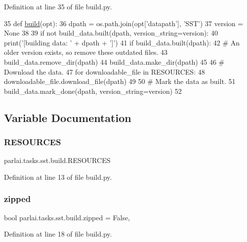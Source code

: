 Definition at line 35 of file build.\+py.


\begin{DoxyCode}
35 \textcolor{keyword}{def }\hyperlink{namespacedialog__babi__feedback_1_1build_a7a9d289f7493a5ded13c4b7f071b6184}{build}(opt):
36     dpath = os.path.join(opt[\textcolor{stringliteral}{'datapath'}], \textcolor{stringliteral}{'SST'})
37     version = \textcolor{keywordtype}{None}
38 
39     \textcolor{keywordflow}{if} \textcolor{keywordflow}{not} build\_data.built(dpath, version\_string=version):
40         print(\textcolor{stringliteral}{'[building data: '} + dpath + \textcolor{stringliteral}{']'})
41         \textcolor{keywordflow}{if} build\_data.built(dpath):
42             \textcolor{comment}{# An older version exists, so remove these outdated files.}
43             build\_data.remove\_dir(dpath)
44         build\_data.make\_dir(dpath)
45 
46         \textcolor{comment}{# Download the data.}
47         \textcolor{keywordflow}{for} downloadable\_file \textcolor{keywordflow}{in} RESOURCES:
48             downloadable\_file.download\_file(dpath)
49 
50         \textcolor{comment}{# Mark the data as built.}
51         build\_data.mark\_done(dpath, version\_string=version)
52 \end{DoxyCode}


\subsection{Variable Documentation}
\mbox{\label{namespaceparlai_1_1tasks_1_1sst_1_1build_a2dd5a09775085687309bdec21b8cf7ad}} 
\subsubsection{\texorpdfstring{R\+E\+S\+O\+U\+R\+C\+ES}{RESOURCES}}
{\footnotesize\ttfamily parlai.\+tasks.\+sst.\+build.\+R\+E\+S\+O\+U\+R\+C\+ES}



Definition at line 13 of file build.\+py.

\mbox{\label{namespaceparlai_1_1tasks_1_1sst_1_1build_a61a03346f350433f532cf63370301032}} 
\subsubsection{\texorpdfstring{zipped}{zipped}}
{\footnotesize\ttfamily bool parlai.\+tasks.\+sst.\+build.\+zipped = False,}



Definition at line 18 of file build.\+py.

